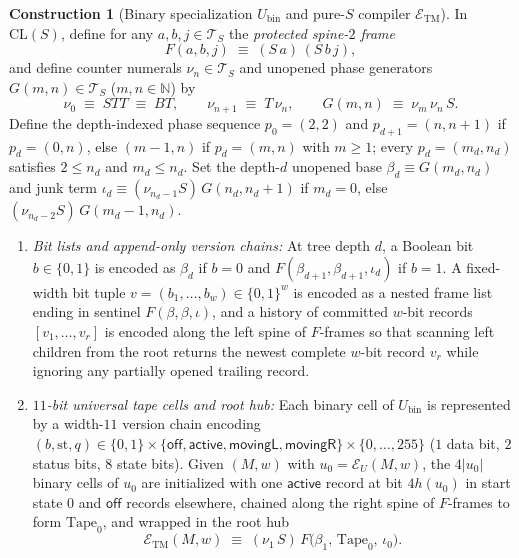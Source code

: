 \documentclass[11pt,reqno]{amsart}
\numberwithin{equation}{section}
\theoremstyle{plain}
\theoremstyle{definition}
\newtheorem{construction}[theorem]{Construction}
\theoremstyle{remark}
\newcommand{\CLS}{\mathrm{CL}(S)}
\newcommand{\TS}{\mathcal{T}_S}
\begin{document}
\begin{construction}[Binary specialization $U_{\mathrm{bin}}$ and pure-$S$ compiler $\mathcal{E}_{\mathrm{TM}}$]
In $\CLS$, define for any $a, b, j \in \TS$ the \emph{protected spine-$2$ frame}
\begin{equation}\label{eq:protected-frame}
  F(a, b, j) \;\equiv\; (S\,a)\,(S\,b\,j),
\end{equation}
and define counter numerals $\nu_n \in \TS$ and unopened phase generators $G(m, n) \in \TS$ ($m, n \in \mathbb{N}$) by
\begin{equation}\label{eq:numeral-generator}
  \nu_0 \;\equiv\; S T T \;\equiv\; B T, \qquad \nu_{n+1} \;\equiv\; T\,\nu_n, \qquad G(m, n) \;\equiv\; \nu_m\,\nu_n\,S.
\end{equation}
Define the depth-indexed phase sequence $p_0 = (2,2)$ and $p_{d+1} = (n, n+1)$ if $p_d = (0, n)$, else $(m-1, n)$ if $p_d = (m, n)$ with $m \ge 1$; every $p_d = (m_d, n_d)$ satisfies $2 \le n_d$ and $m_d \le n_d$. Set the depth-$d$ unopened base $\beta_d \equiv G(m_d, n_d)$ and junk term $\iota_d \equiv (\nu_{n_d - 1} S)\,G(n_d, n_d + 1)$ if $m_d = 0$, else $(\nu_{n_d - 2} S)\,G(m_d - 1, n_d)$.
\begin{enumerate}[label=(\roman*),leftmargin=2.2em]
  \item \emph{Bit lists and append-only version chains:} At tree depth $d$, a Boolean bit $b \in \{0,1\}$ is encoded as $\beta_d$ if $b = 0$ and $F(\beta_{d+1}, \beta_{d+1}, \iota_d)$ if $b = 1$. A fixed-width bit tuple $v = (b_1,\dots,b_w) \in \{0,1\}^w$ is encoded as a nested frame list ending in sentinel $F(\beta, \beta, \iota)$, and a history of committed $w$-bit records $[v_1, \dots, v_r]$ is encoded along the left spine of $F$-frames so that scanning left children from the root returns the newest complete $w$-bit record $v_r$ while ignoring any partially opened trailing record.
  \item \emph{$11$-bit universal tape cells and root hub:} Each binary cell of $U_{\mathrm{bin}}$ is represented by a width-$11$ version chain encoding $(b, \mathrm{st}, q) \in \{0,1\} \times \{\mathsf{off}, \mathsf{active}, \mathsf{movingL}, \mathsf{movingR}\} \times \{0,\dots,255\}$ ($1$ data bit, $2$ status bits, $8$ state bits). Given $(M,w)$ with $u_0 = \mathcal{E}_U(M,w)$, the $4|u_0|$ binary cells of $u_0$ are initialized with one $\mathsf{active}$ record at bit $4 h(u_0)$ in start state $0$ and $\mathsf{off}$ records elsewhere, chained along the right spine of $F$-frames to form $\mathrm{Tape}_0$, and wrapped in the root hub
  \[
    \mathcal{E}_{\mathrm{TM}}(M, w) \;\equiv\; (\nu_1\,S)\,F\bigl(\beta_1,\, \mathrm{Tape}_0,\, \iota_0\bigr).
  \]
\end{enumerate}
\end{construction}
\end{document}
